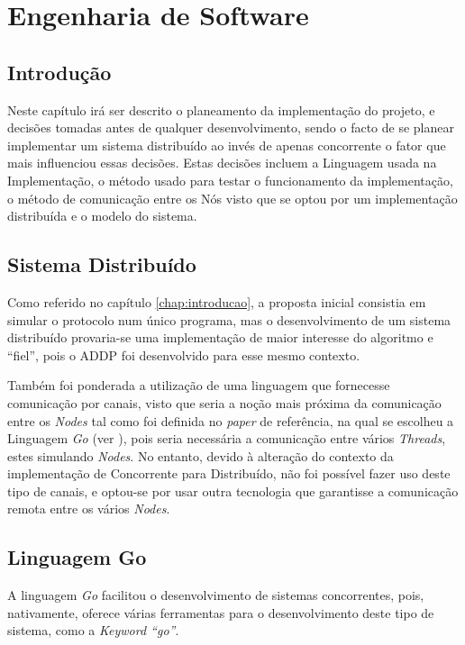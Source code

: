 \chapter{Engenharia de Software}
\label{chap:engenharia}

\section{Introdução}
\label{engenharia:sec:introducao}
Neste capítulo irá ser descrito o planeamento da implementação do projeto, e decisões tomadas antes de qualquer desenvolvimento, sendo o facto de se planear implementar um sistema distribuído ao invés de 
apenas concorrente o fator que mais influenciou essas decisões.
Estas decisões incluem a Linguagem usada na Implementação, o método usado para testar o funcionamento da implementação,
o método de comunicação entre os Nós visto que se optou por um implementação distribuída e o modelo do sistema.

\section{Sistema Distribuído}
\label{engenharia:sec:sistema}
Como referido no capítulo \ref{chap:introducao}, a proposta inicial consistia em simular o protocolo num único programa,
mas o desenvolvimento de um sistema distribuído 
provaria-se uma implementação de maior interesse do algoritmo e ``fiel'', pois o \acs*{ADDP} foi desenvolvido para esse mesmo contexto.

Também foi ponderada a utilização de uma linguagem que fornecesse comunicação por canais,
visto que seria a noção mais próxima da comunicação entre os \emph{Nodes} tal como foi definida no \emph{paper} de referência, na qual se
escolheu a Linguagem \emph{Go} (ver \label{implementacao:subsec:go}), pois seria necessária a comunicação entre vários \emph{Threads}, estes simulando \emph{Nodes}.
No entanto, devido à alteração do contexto da implementação de Concorrente para Distribuído, não foi possível fazer uso deste tipo de canais, 
e optou-se por usar outra tecnologia que garantisse a comunicação remota entre os vários \emph{Nodes}.


\section{Linguagem Go}
\label{engenharia:sec:go}

A linguagem \emph{Go} facilitou o desenvolvimento de sistemas concorrentes, pois, nativamente, oferece várias ferramentas para o desenvolvimento deste tipo de sistema, como a \emph{Keyword ``go''}.

